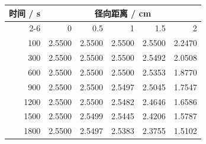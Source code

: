 \begin{tabular}{rrrrrr}
\toprule
时间 / s & \multicolumn{5}{c}{径向距离 / cm} \\
\cmidrule(lr){2-6}
 & 0 & 0.5 & 1 & 1.5 & 2 \\
\midrule
100 & 2.5500 & 2.5500 & 2.5500 & 2.5500 & 2.2470 \\
300 & 2.5500 & 2.5500 & 2.5500 & 2.5492 & 2.0508 \\
600 & 2.5500 & 2.5500 & 2.5500 & 2.5353 & 1.8770 \\
900 & 2.5500 & 2.5500 & 2.5497 & 2.5045 & 1.7547 \\
1200 & 2.5500 & 2.5500 & 2.5482 & 2.4646 & 1.6586 \\
1500 & 2.5500 & 2.5499 & 2.5445 & 2.4206 & 1.5787 \\
1800 & 2.5500 & 2.5497 & 2.5383 & 2.3755 & 1.5102 \\
\bottomrule
\end{tabular}

